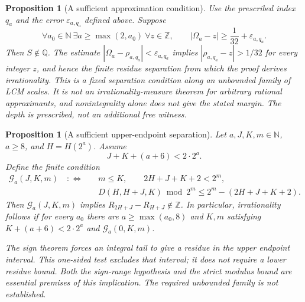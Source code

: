 \documentclass[11pt]{article}
\theoremstyle{plain}
\newtheorem{prop}[thm]{Proposition}
\theoremstyle{definition}
\theoremstyle{remark}
\begin{document}
\begin{prop}[A sufficient approximation condition]\label{prop:SEP-03}
Use the prescribed index $q_a$ and the error
$\varepsilon_{a,q_a}$ defined above. Suppose
\[
 \forall a_0\in\mathbb N\ \exists a\ge\max(2,a_0)\ \forall z\in\mathbb Z,
 \qquad |\Omega_a-z|\ge\frac1{32}+\varepsilon_{a,q_a}.
\]
Then $S\notin\mathbb Q$. The estimate
$|\Omega_a-\rho_{a,q_a}|<\varepsilon_{a,q_a}$ implies
$|\rho_{a,q_a}-z|>1/32$ for every integer $z$, and hence the finite
residue separation from which the proof derives irrationality.
This is a fixed separation condition along an unbounded family of LCM
scales. It is not an irrationality-measure theorem for arbitrary
rational approximants, and nonintegrality alone does not give the
stated margin. The depth is prescribed, not an additional free witness.

\end{prop}

\begin{prop}[A sufficient upper-endpoint separation]\label{prop:TE-04}
Let $a,J,K,m\in\mathbb N$, $a\ge8$, and $H=H(2^a)$. Assume
\[
 J+K+(a+6)<2\cdot2^a.
\]
Define the finite condition
\[
 \begin{aligned}
 \mathcal G_a(J,K,m)\quad:\Longleftrightarrow\quad
 &m\le K,\qquad 2H+J+K+2<2^m,\\
 &D(H,H+J,K)\bmod2^m\le2^m-(2H+J+K+2).
 \end{aligned}
\]
Then $\mathcal G_a(J,K,m)$ implies $R_{2H+J}-R_{H+J}\notin\mathbb Z$.
In particular, irrationality follows if for every $a_0$ there are
$a\ge\max(a_0,8)$ and $K,m$ satisfying $K+(a+6)<2\cdot2^a$ and
$\mathcal G_a(0,K,m)$.

The sign theorem forces an integral tail to give a residue in the upper
endpoint interval. This one-sided test excludes that interval; it does
not require a lower residue bound. Both the sign-range hypothesis and
the strict modulus bound are essential premises of this implication.
The required unbounded family is not established.
\end{prop}
\end{document}
